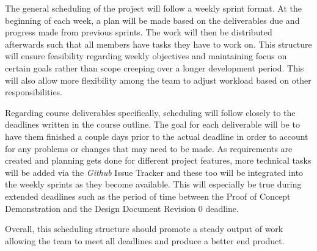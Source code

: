 \documentclass{article}
\begin{document}
The general scheduling of the project will follow a weekly sprint format. At the beginning
of each week, a plan will be made based on the deliverables due and progress made from previous sprints. The
work will then be distributed afterwards such that all members have tasks they have
to work on. This structure will ensure feasibility regarding weekly
objectives and maintaining focus on certain goals rather than scope creeping over
a longer development period. This will also allow more flexibility among the team to adjust workload
based on other responsibilities. \par

Regarding course deliverables specifically, scheduling will follow closely to the deadlines written in the
course outline. The goal for each deliverable will be to have them finished a couple days
prior to the actual deadline in order to account for any problems or changes that may
need to be made. As requirements are created and planning gets done for different project features,
more technical tasks will be added via the \emph{Github} Issue Tracker and these too will be
integrated into the weekly sprints as they become available. This will especially be true during
extended deadlines such as the period of time between the Proof of Concept Demonstration and
the Design Document Revision 0 deadline. \par

Overall, this scheduling structure should promote a steady output of work allowing the team
to meet all deadlines and produce a better end product.
\end{document}
